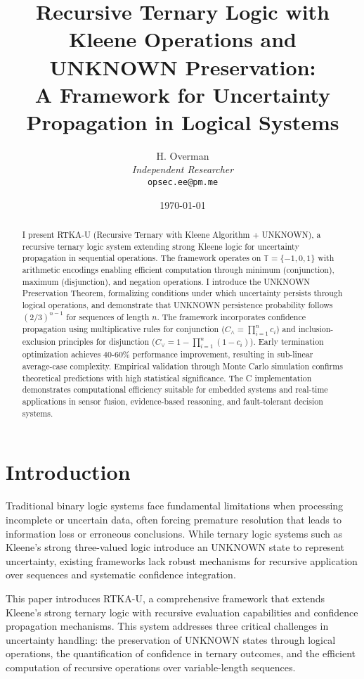 \documentclass[11pt,a4paper]{article}
\title{Recursive Ternary Logic with Kleene Operations and UNKNOWN Preservation:\\
A Framework for Uncertainty Propagation in Logical Systems}
\author{H. Overman\\
\textit{Independent Researcher}\\
\texttt{opsec.ee@pm.me}}
\date{\today}
\begin{document}
\maketitle

\begin{abstract}
I present RTKA-U (Recursive Ternary with Kleene Algorithm + UNKNOWN), a recursive ternary logic system extending strong Kleene logic for uncertainty propagation in sequential operations. The framework operates on $\mathbb{T} = \{-1, 0, 1\}$ with arithmetic encodings enabling efficient computation through minimum (conjunction), maximum (disjunction), and negation operations. I introduce the UNKNOWN Preservation Theorem, formalizing conditions under which uncertainty persists through logical operations, and demonstrate that UNKNOWN persistence probability follows $(2/3)^{n-1}$ for sequences of length $n$. The framework incorporates confidence propagation using multiplicative rules for conjunction ($C_{\land} = \prod_{i=1}^n c_i$) and inclusion-exclusion principles for disjunction ($C_{\lor} = 1 - \prod_{i=1}^n (1 - c_i)$). Early termination optimization achieves 40-60\% performance improvement, resulting in sub-linear average-case complexity. Empirical validation through Monte Carlo simulation confirms theoretical predictions with high statistical significance. The C implementation demonstrates computational efficiency suitable for embedded systems and real-time applications in sensor fusion, evidence-based reasoning, and fault-tolerant decision systems.
\end{abstract}

\vspace{0.5cm}

\section{Introduction}

Traditional binary logic systems face fundamental limitations when processing incomplete or uncertain data, often forcing premature resolution that leads to information loss or erroneous conclusions. While ternary logic systems such as Kleene's strong three-valued logic \cite{kleene1952} introduce an UNKNOWN state to represent uncertainty, existing frameworks lack robust mechanisms for recursive application over sequences and systematic confidence integration.

This paper introduces RTKA-U, a comprehensive framework that extends Kleene's strong ternary logic with recursive evaluation capabilities and confidence propagation mechanisms. This system addresses three critical challenges in uncertainty handling: the preservation of UNKNOWN states through logical operations, the quantification of confidence in ternary outcomes, and the efficient computation of recursive operations over variable-length sequences.
\end{document}
